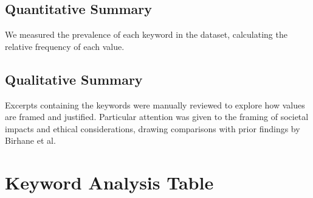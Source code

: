 \documentclass{article}
\begin{document}
\subsection{Quantitative Summary}
We measured the prevalence of each keyword in the dataset, calculating the relative frequency of each value.

\subsection{Qualitative Summary}
Excerpts containing the keywords were manually reviewed to explore how values are framed and justified. Particular attention was given to the framing of societal impacts and ethical considerations, drawing comparisons with prior findings by Birhane et al.





\appendix
\section{Keyword Analysis Table}
\end{document}
